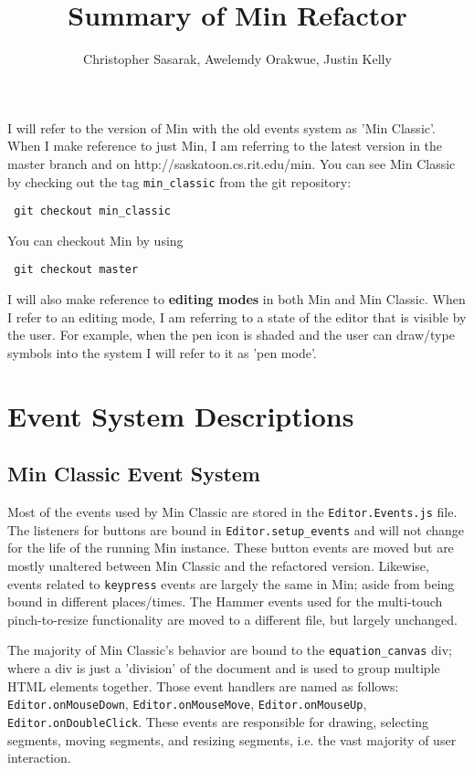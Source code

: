 \documentclass[letterpaper]{article}
\begin{document}
\author{Christopher Sasarak, Awelemdy Orakwue, Justin Kelly} \title{Summary of Min Refactor} 
\maketitle

I will refer to the version of Min with the old events system as 'Min Classic'.
When I make reference to just Min, I am referring to the latest version in the
master branch and on http://saskatoon.cs.rit.edu/min.
You can see Min Classic by checking out the tag \verb+min_classic+ from the git
repository: \begin{verbatim} git checkout min_classic \end{verbatim} You can
checkout Min by using \begin{verbatim} git checkout master \end{verbatim}

I will also make reference to \textbf{editing modes} in both Min and Min Classic.
When I refer to an editing mode, I am referring to a state of the editor that is
visible by the user. For example, when the pen icon is shaded and the user can
draw/type symbols into the system I will refer to it as 'pen mode'.

\section*{Event System Descriptions}

\subsection*{Min Classic Event System} 
Most of the events used by Min Classic are stored in the \verb+Editor.Events.js+ file. 
The listeners for buttons are bound in \verb+Editor.setup_events+ and will not
change for the life of the running Min instance. These button events are moved
but are mostly unaltered between Min Classic and the refactored
version. Likewise, events related to \verb+keypress+ events are largely the
same in Min; aside from being bound in different places/times. The Hammer events
used for the multi-touch pinch-to-resize functionality are moved to a different
file, but largely unchanged.

The majority of Min Classic's behavior are bound to the \verb+equation_canvas+
div; where a div is just a 'division' of the document and is used to group multiple
HTML elements together. Those event handlers are named as follows:
\verb+Editor.onMouseDown+, \verb+Editor.onMouseMove+,
\verb+Editor.onMouseUp+, \verb+Editor.onDoubleClick+. These events are
responsible for drawing, selecting segments, moving segments, and resizing
segments, i.e. the vast majority of user interaction. 
\end{document}
